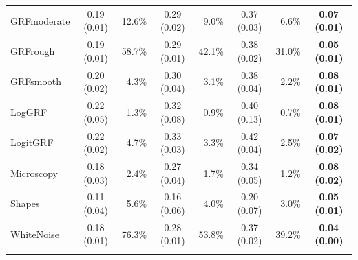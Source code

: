 \documentclass[al, 27pt, plainboxedsections, landscape]{sciposter}
\begin{document}
\begin{multicols}{3}
\begin{table}[t!]
{\begin{tabular}{l|cr|@{\hskip 0.2in}cr|@{\hskip 0.2in}cr|@{\hskip 0.2in}c}
 GRFmoderate	&	0.19	(0.01)	&	12.6\%	&	0.29	(0.02)	&	9.0\%	&	0.37	(0.03)	&	6.6\%	&	{\bf 0.07	(0.01)}	\\
 GRFrough		&	0.19	(0.01)	&	58.7\%	&	0.29	(0.01)	&	42.1\%	&	0.38	(0.02)	&	31.0\%	&	{\bf 0.05	(0.01)}	\\
 GRFsmooth		&	0.20	(0.02)	&	4.3\%	&	0.30	(0.04)	&	3.1\%	&	0.38	(0.04)	&	2.2\%	&	{\bf 0.08	(0.01)}	\\
 LogGRF			&	0.22	(0.05)	&	1.3\%	&	0.32	(0.08)	&	0.9\%	&	0.40	(0.13)	&	0.7\%	&	{\bf 0.08	(0.01)}	\\
 LogitGRF		&	0.22	(0.02)	&	4.7\%	&	0.33	(0.03)	&	3.3\%	&	0.42	(0.04)	&	2.5\%	&	{\bf 0.07	(0.02)}	\\
 Microscopy 	&	0.18	(0.03)	&	2.4\%	&	0.27	(0.04)	&	1.7\%	&	0.34	(0.05)	&	1.2\%	&	{\bf 0.08	(0.02)}	\\
 Shapes			&	0.11	(0.04)	&	5.6\%	&	0.16	(0.06)	&	4.0\%	&	0.20	(0.07)	&	3.0\%	&	{\bf 0.05	(0.01)}	\\
 WhiteNoise		&	0.18	(0.01)	&	76.3\%	&	0.28	(0.01)	&	53.8\%	&	0.37	(0.02)	&	39.2\%	&	{\bf 0.04	(0.00)}	\\
\hline\noalign{\smallskip}
 \end{tabular}}
\end{table}



\small
\end{multicols}
\end{document}
